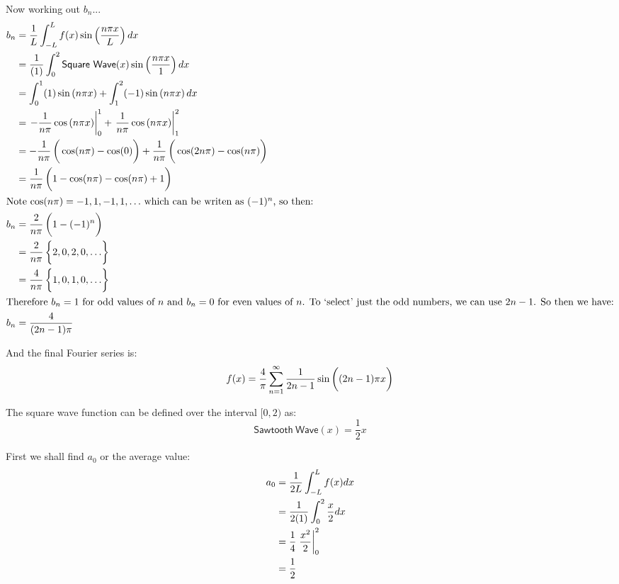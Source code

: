 \documentclass[letterpaper,8pt]{article}
\begin{document}
Now working out $b_n$...
\begin{align*}
b_n &= \frac{1}{L} \int_{-L}^L f(x) \sin \left( \frac{n\pi x}{L} \right) dx \\
    &= \frac{1}{(1)} \int_0^2 \mathsf{Square\ Wave}(x) \sin \left( \frac{n\pi x}{1} \right) dx \\
    &= \int_0^1 (1) \sin \left( n\pi x \right) + \int_1^2 (-1) \sin \left( n\pi x \right) dx \\
    &= \left. -\frac{1}{n \pi} \cos \left( n\pi x \right)\right|^1_0 + \left. \frac{1}{n \pi} \cos \left( n\pi x \right)\right|^2_1 \\
    &= -\frac{1}{n \pi} \left( \vphantom{\frac{1}{2}} \cos ( n\pi ) - \cos ( 0 ) \right) + \frac{1}{n \pi} \left( \vphantom{\frac{1}{2}} \cos(2n\pi) - \cos(n\pi) \right) \\ 
    &= \frac{1}{n \pi} \left( \vphantom{\frac{1}{2}} 1 - \cos(n\pi) - \cos(n\pi) + 1\right) \\
\intertext{Note $\cos(n\pi) = -1, 1, -1, 1, \ldots$\ which can be writen as $(-1)^n$, so then: }
b_n &= \frac{2}{n \pi} \left( \vphantom{\frac{1}{2}} 1 - (-1)^n \right) \\
    &= \frac{2}{n \pi} \left\{ \vphantom{\frac{1}{2}} 2, 0, 2, 0, \ldots \right\} \\
    &= \frac{4}{n \pi} \left\{ \vphantom{\frac{1}{2}} 1, 0, 1, 0, \ldots \right\} \\
\intertext{Therefore $b_n = 1$ for odd values of $n$ and $b_n = 0$ for even values of $n$.  To `select' just the odd numbers, we can use $2n - 1$.  So then we have:} 
b_n &= \frac{4}{(2n - 1)\pi} 
\end{align*}

And the final Fourier series is:
\[
f(x) = \frac{4}{\pi} \sum^\infty_{n = 1} \frac{1}{2n - 1} \sin \left( (2n - 1) \pi \vphantom{\frac{1}{2}} x \right)
\]


The square wave function can be defined over the interval $[0, 2)$ as:
\[
\mathsf{Sawtooth\ Wave}(x) = \frac{1}{2} x 
\]

First we shall find $a_0$ or the average value:
\begin{align*}
a_0 &= \frac{1}{2L} \int_{-L}^L f(x) dx  \\
    &= \frac{1}{2(1)} \int_0^{2} \frac{x}{2} dx \\
    &= \frac{1}{4} \left. \frac{x^2}{2} \vphantom{\frac{1}{2}} \right|^2_0 \\
    &= \frac{1}{2}
\end{align*}
\end{document}
